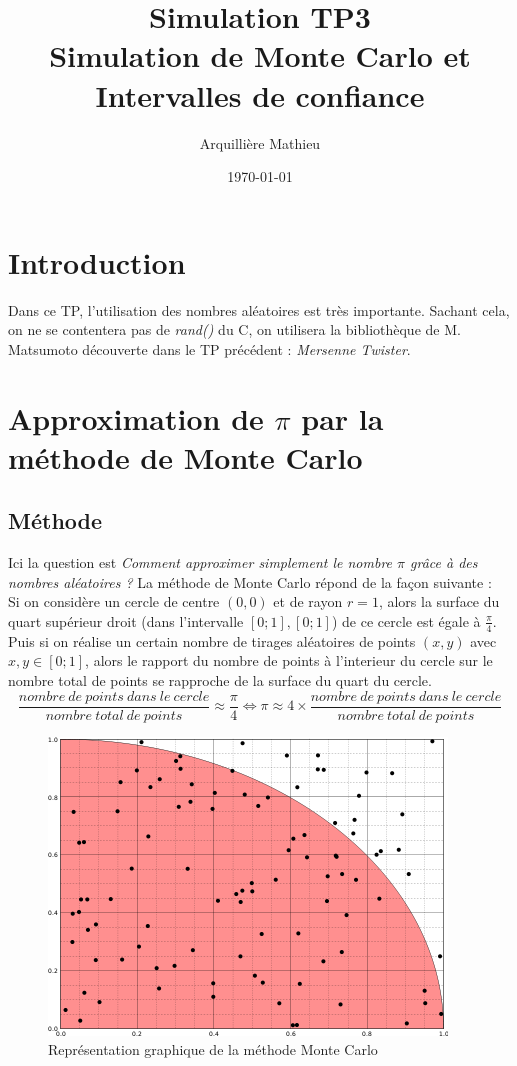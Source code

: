 \documentclass{article}
\title{Simulation TP3\\Simulation de Monte Carlo et Intervalles de confiance}
\author{Arquillière Mathieu}
\date{\today}
\begin{document}
\begin{titlepage}
  \maketitle
\end{titlepage}

\tableofcontents
\newpage
\listoffigures
\newpage

\section{Introduction}
Dans ce TP, l'utilisation des nombres aléatoires est très importante. Sachant cela,
on ne se contentera pas de \emph{rand()} du C, on utilisera la bibliothèque de
M. Matsumoto découverte dans le TP précédent : \emph{Mersenne Twister}.

\section{Approximation de $\pi$ par la méthode de Monte Carlo}
\subsection{Méthode}
Ici la question est \emph{Comment approximer simplement le nombre $\pi$ grâce à des nombres aléatoires ?}
La méthode de Monte Carlo répond de la façon suivante :\\
Si on considère un cercle de centre $(0,0)$ et de rayon $r=1$, alors la surface
du quart supérieur droit (dans l'intervalle $[0;1],[0;1]$) de ce cercle est égale à $\frac{\pi}{4}$.
Puis si on réalise un certain nombre de tirages aléatoires de points $(x,y)$ avec $x,y \in [0;1]$,
alors le rapport du nombre de points à l'interieur du cercle sur le nombre total de points
se rapproche de la surface du quart du cercle.
$$
\frac{nombre\:de\:points\:dans\:le\:cercle}{nombre\:total\:de\:points} \approx \frac{\pi}{4}
\iff \pi \approx 4 \times \frac{nombre\:de\:points\:dans\:le\:cercle}{nombre\:total\:de\:points}
$$

\begin{figure}[!ht]
  \caption{Représentation graphique de la méthode Monte Carlo}
  \label{Méthode Monte Carlo}
  \centering
  \includegraphics{images/monte_carlo_pi.png}
\end{figure}
\end{document}
